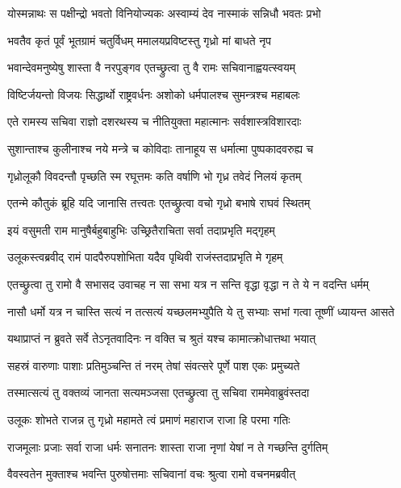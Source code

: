 \twolineshloka
{योस्मन्नाथः स पक्षीन्द्रो भवतो विनियोज्यकः}
{अस्वाम्यं देव नास्माकं सन्निधौ भवतः प्रभो}%

\twolineshloka
{भवतैव कृतं पूर्वं भूतग्रामं चतुर्विधम्}
{ममालयप्रविष्टस्तु गृध्रो मां बाधते नृप}%

\twolineshloka
{भवान्देवमनुष्येषु शास्ता वै नरपुङ्गव}
{एतच्छ्रुत्वा तु वै रामः सचिवानाह्वयत्स्वयम्}%

\twolineshloka
{विष्टिर्जयन्तो विजयः सिद्धार्थो राष्ट्रवर्धनः}
{अशोको धर्मपालश्च सुमन्त्रश्च महाबलः}%

\twolineshloka
{एते रामस्य सचिवा राज्ञो दशरथस्य च}
{नीतियुक्ता महात्मानः सर्वशास्त्रविशारदाः}%

\twolineshloka
{सुशान्ताश्च कुलीनाश्च नये मन्त्रे च कोविदाः}
{तानाहूय स धर्मात्मा पुष्पकादवरुह्य च}%

\twolineshloka
{गृध्रोलूकौ विवदन्तौ पृच्छति स्म रघूत्तमः}
{कति वर्षाणि भो गृध्र तवेदं निलयं कृतम्}%

\twolineshloka
{एतन्मे कौतुकं ब्रूहि यदि जानासि तत्त्वतः}
{एतच्छ्रुत्वा वचो गृध्रो बभाषे राघवं स्थितम्}%

\twolineshloka
{इयं वसुमती राम मानुषैर्बहुबाहुभिः}
{उच्छ्रितैराचिता सर्वा तदाप्रभृति मद्गृहम्}%

\twolineshloka
{उलूकस्त्वब्रवीद् रामं पादपैरुपशोभिता}
{यदैव पृथिवी राजंस्तदाप्रभृति मे गृहम्}%

\twolineshloka
{एतच्छ्रुत्वा तु रामो वै सभासद उवाचह}
{न सा सभा यत्र न सन्ति वृद्धा वृद्धा न ते ये न वदन्ति धर्मम्}%

\twolineshloka
{नासौ धर्मो यत्र न चास्ति सत्यं न तत्सत्यं यच्छलमभ्युपैति}
{ये तु सभ्याः सभां गत्वा तूष्णीं ध्यायन्त आसते}%

\twolineshloka
{यथाप्राप्तं न ब्रुवते सर्वे तेऽनृतवादिनः}
{न वक्ति च श्रुतं यश्च कामात्क्रोधात्तथा भयात्}%

\twolineshloka
{सहस्रं वारुणाः पाशाः प्रतिमुञ्चन्ति तं नरम्}
{तेषां संवत्सरे पूर्णे पाश एकः प्रमुच्यते}%

\twolineshloka
{तस्मात्सत्यं तु वक्तव्यं जानता सत्यमञ्जसा}
{एतच्छ्रुत्वा तु सचिवा राममेवाब्रुवंस्तदा}%

\twolineshloka
{उलूकः शोभते राजन्न तु गृध्रो महामते}
{त्वं प्रमाणं महाराज राजा हि परमा गतिः}%

\twolineshloka
{राजमूलाः प्रजाः सर्वा राजा धर्मः सनातनः}
{शास्ता राजा नृणां येषां न ते गच्छन्ति दुर्गतिम्}%

\twolineshloka
{वैवस्वतेन मुक्ताश्च भवन्ति पुरुषोत्तमाः}
{सचिवानां वचः श्रुत्वा रामो वचनमब्रवीत्}%

